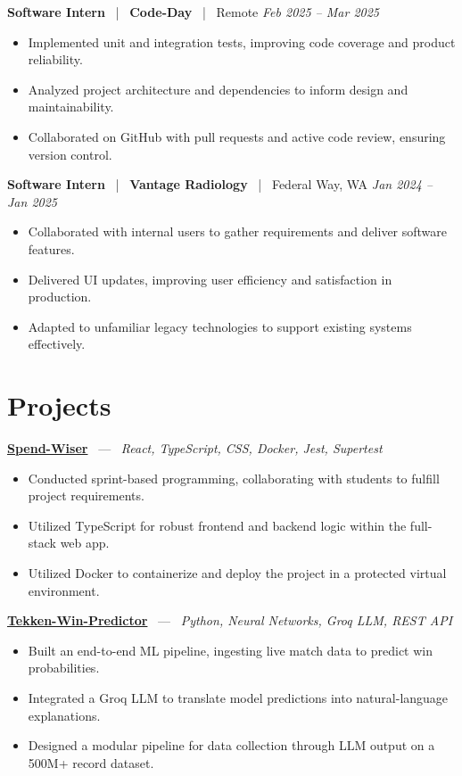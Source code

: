 \documentclass[10pt, letterpaper]{article}
\newcommand{\jobhead}[4]{%
  \vspace{5pt}%
  {\bfseries\color{dark}#1}%
  ~{\color{light}|}~%
  {\bfseries\color{navy}#2}%
  ~{\color{light}|}~%
  {\color{light}#3}%
  \hfill{\color{light}\small\textit{#4}}\\[-2pt]%
}
\newcommand{\projhead}[3]{%
  \vspace{5pt}%
  {\bfseries\color{dark}\href{#2}{#1}}%
  ~{\color{light}---}~%
  {\color{light}\small\textit{#3}}\\[-2pt]%
}
\begin{document}
\jobhead{Software Intern}{Code-Day}{Remote}{Feb 2025 – Mar 2025}
\begin{itemize}
  \item Implemented unit and integration tests, improving code coverage and product reliability.
  \item Analyzed project architecture and dependencies to inform design and maintainability.
  \item Collaborated on GitHub with pull requests and active code review, ensuring version control.
\end{itemize}

\jobhead{Software Intern}{Vantage Radiology}{Federal Way, WA}{Jan 2024 – Jan 2025}
\begin{itemize}
  \item Collaborated with internal users to gather requirements and deliver software features.
  \item Delivered UI updates, improving user efficiency and satisfaction in production.
  \item Adapted to unfamiliar legacy technologies to support existing systems effectively.
\end{itemize}

\section{Projects}

\projhead{Spend-Wiser}{https://github.com/JesseChum/w26-sdev372-spendwiser-finance-tracker}{React, TypeScript, CSS, Docker, Jest, Supertest}
\begin{itemize}
  \item Conducted sprint-based programming, collaborating with students to fulfill project requirements.
  \item Utilized TypeScript for robust frontend and backend logic within the full-stack web app.
  \item Utilized Docker to containerize and deploy the project in a protected virtual environment.
\end{itemize}

\projhead{Tekken-Win-Predictor}{}{Python, Neural Networks, Groq LLM, REST API}
\begin{itemize}
  \item Built an end-to-end ML pipeline, ingesting live match data to predict win probabilities.
  \item Integrated a Groq LLM to translate model predictions into natural-language explanations.
  \item Designed a modular pipeline for data collection through LLM output on a 500M+ record dataset.
\end{itemize}
\end{document}
